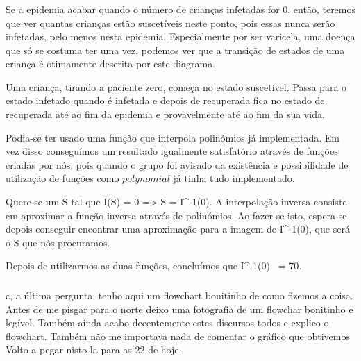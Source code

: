 \documentclass[portuguese, a4paper]{article}
\begin{document}
		\subsubsection{}
		\par
		Se a epidemia acabar quando o número de crianças infetadas for 0, então, teremos
		que ver quantas crianças estão suscetíveis neste ponto, pois essas nunca serão infetadas, pelo menos nesta
		epidemia. Especialmente por ser varicela, uma doença que só se costuma ter uma vez, 
		podemos ver que a transição de estados de uma criança 
		é otimamente descrita por este diagrama.
		
		Uma criança, tirando a paciente zero, começa no estado suscetível. Passa
		para o estado infetado quando é infetada e depois de recuperada fica no estado de recuperada até ao fim da 
		epidemia e provavelmente até ao fim da sua vida.
		
		
		Podia-se ter usado uma função que interpola polinómios já implementada.
		Em vez disso conseguímos um resultado igualmente satisfatório através de funções criadas por nós, pois
		quando o grupo foi avisado da existência e possibilidade de utilização de funções como $polynomial$ %
		já tinha tudo implementado.
		
		Quere-se um S tal que I(S) = 0 => S = I^-1(0).
		A interpolação inversa consiste em aproximar a função inversa através de polinómios.
		Ao fazer-se isto, espera-se depois conseguir encontrar uma aproximação para a imagem de I^-1(0), 
		que será o S que nós procuramos.
		\par
		Depois de utilizarmos as duas funções, concluímos que I^-1(0) ~= 70.
		
		\subsubsection{}
		\par
		c, a última pergunta.
		tenho aqui um flowchart bonitinho de como fizemos a coisa.
		Antes de me pisgar para o norte deixo uma fotografia de um 
		flowchar bonitinho e legível. Também ainda acabo decentemente 
		estes discursos todos e explico o flowchart.
		Também não me importava nada de comentar o gráfico que obtivemos
		Volto a pegar nisto la para as 22 de hoje. 
		
\end{document}
